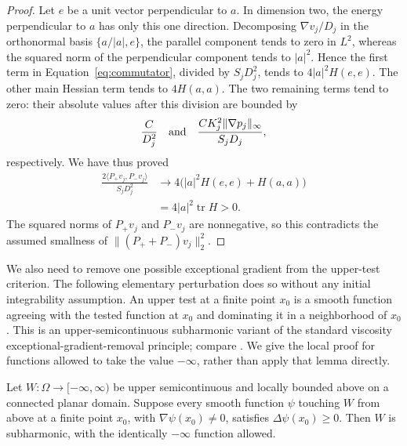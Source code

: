 \begin{proof}
Let $e$ be a unit vector perpendicular to $a$.  In dimension two,
the energy perpendicular to $a$ has only this one direction.
Decomposing $\nabla v_j/D_j$ in the orthonormal basis
$\{a/|a|,e\}$, the parallel component tends to zero in $L^2$,
whereas the squared norm of the perpendicular component tends to
$|a|^2$.  Hence the first term in
Equation~\eqref{eq:commutator}, divided by $S_jD_j^2$, tends to
$4|a|^2H(e,e)$.  The other main Hessian term tends to $4H(a,a)$.
The two remaining terms tend to zero: their absolute values after
this division are bounded by
\[
 \frac{C}{D_j^2}
 \quad\hbox{and}\quad
 \frac{CK_j^2\|\nabla p_j\|_\infty}{S_jD_j},
\]
respectively.  We have thus proved
\[
 \begin{aligned}
 \frac{2\langle P_+v_j,P_-v_j\rangle}{S_jD_j^2}
 &\longrightarrow 4\bigl(|a|^2H(e,e)+H(a,a)\bigr)\\
 &=4|a|^2\operatorname{tr}H>0.
 \end{aligned}
\]
The squared norms of $P_+v_j$ and $P_-v_j$ are nonnegative, so this
contradicts the assumed smallness of $\|(P_++P_-)v_j\|_2^2$.
\end{proof}

We also need to remove one possible exceptional gradient from the
upper-test criterion.  The following elementary perturbation does
so without any initial integrability assumption.  An upper test at
a finite point $x_0$ is a smooth function agreeing with the tested
function at $x_0$ and dominating it in a neighborhood of $x_0$.
This is an upper-semicontinuous subharmonic variant of the standard
viscosity exceptional-gradient-removal principle; compare
\cite[Section~5, Lemma~6]{ImbertSilvestre2013}.  We give the local
proof for functions allowed to take the value $-\infty$, rather than
apply that lemma directly.

\begin{lemma}
\label{lem:exceptional-gradient}
Let $W\colon\Omega\to[-\infty,\infty)$ be upper semicontinuous and
locally bounded above on a connected planar domain.  Suppose every
smooth function $\psi$ touching $W$ from above at a finite point
$x_0$, with $\nabla\psi(x_0)\ne0$, satisfies
$\Delta\psi(x_0)\ge0$.  Then $W$ is subharmonic, with the
identically $-\infty$ function allowed.
\end{lemma}

